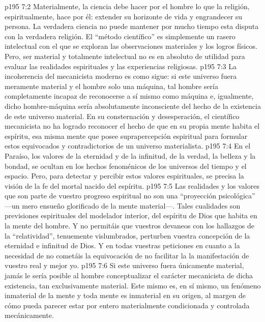 \vs p195 7:2 Materialmente, la ciencia debe hacer por el hombre lo que la religión, espiritualmente, hace por él: extender su horizonte de vida y engrandecer su persona. La verdadera ciencia no puede mantener por mucho tiempo esta disputa con la verdadera religión. El “método científico” es simplemente un rasero intelectual con el que se exploran las observaciones materiales y los logros físicos. Pero, ser material y totalmente intelectual no es en absoluto de utilidad para evaluar las realidades espirituales y las experiencias religiosas.
\vs p195 7:3 La incoherencia del mecanicista moderno es como sigue: si este universo fuera meramente material y el hombre solo una máquina, tal hombre sería completamente incapaz de reconocerse a sí mismo como máquina e, igualmente, dicho hombre\hyp{}máquina sería absolutamente inconsciente del hecho de la existencia de este universo material. En su consternación y desesperación, el científico mecanicista no ha logrado reconocer el hecho de que en su propia mente habita el espíritu, esa misma mente que posee suprapercepción espiritual para formular estos  equivocados y contradictorios de un universo materialista.
\vs p195 7:4 En el Paraíso, los valores de la eternidad y de la infinitud, de la verdad, la belleza y la bondad, se ocultan en los hechos fenoménicos de los universos del tiempo y el espacio. Pero, para detectar y percibir estos valores espirituales, se precisa la visión de la fe del mortal nacido del espíritu.
\vs p195 7:5 Las realidades y los valores que son parte de vuestro progreso espiritual no son una “proyección psicológica” ---un mero ensueño glorificado de la mente material---. Tales cualidades son previsiones espirituales del modelador interior, del espíritu de Dios que habita en la mente del hombre. Y no permitáis que vuestros devaneos con los hallazgos de la “relatividad”, tenuemente vislumbrados, perturben vuestra concepción de la eternidad e infinitud de Dios. Y en todas vuestras peticiones en cuanto a la necesidad de  no cometáis la equivocación de no facilitar la  la manifestación de vuestro real y mejor yo.
\vs p195 7:6 Si este universo fuera únicamente material, jamás le sería posible al hombre conceptualizar el carácter mecanicista de dicha existencia, tan exclusivamente material. Este mismo  es, en sí mismo, un fenómeno inmaterial de la mente y toda mente es inmaterial en su origen, al margen de cómo pueda parecer estar por entero materialmente condicionada y controlada mecánicamente.
